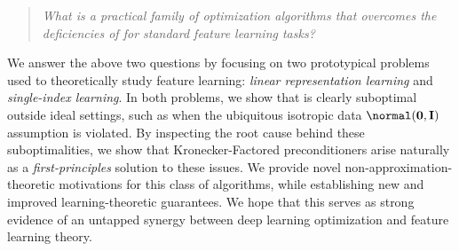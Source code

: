 \begin{quote}
    \centering
    \textit{What is a \emph{practical} family of optimization algorithms that overcomes the deficiencies of \SGD for standard feature learning tasks?}
\end{quote}
We answer the above two questions by focusing on two prototypical problems used to theoretically study feature learning: \textit{linear representation learning} and \textit{single-index learning}. In both problems, we show that \SGD is clearly suboptimal outside ideal settings, such as when the ubiquitous isotropic data $\normal(\mathbf{0}, \mathbf{I})$ assumption is violated. By inspecting the root cause behind these suboptimalities, we show that Kronecker-Factored preconditioners arise naturally as a \emph{first-principles} solution to these issues. We provide novel non-approximation-theoretic motivations for this class of algorithms, while establishing new and improved learning-theoretic guarantees. We hope that this serves as strong evidence of an untapped synergy between deep learning optimization and feature learning theory.
